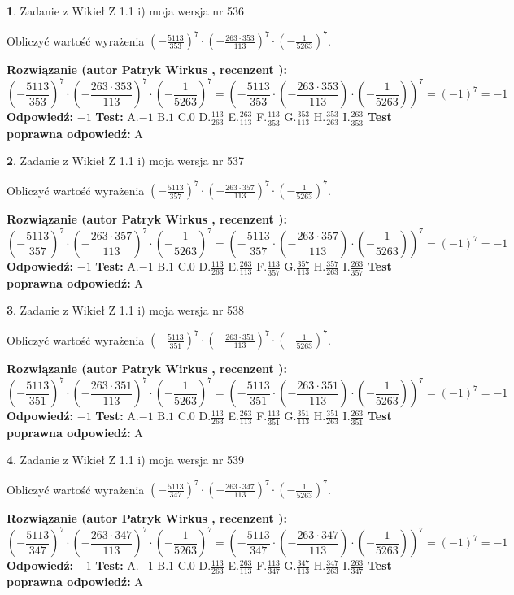 \documentclass[12pt, a4paper]{article}
\theoremstyle{definition} %
\newtheorem{zad}{}
\newcommand{\zadStart}[1]{\begin{zad}#1\newline}
\newcommand{\zadStop}{\end{zad}}
\newcommand{\rozwStart}[2]{\noindent \textbf{Rozwiązanie (autor #1 , recenzent #2): }\newline}
\newcommand{\rozwStop}{\newline}
\newcommand{\odpStart}{\noindent \textbf{Odpowiedź:}\newline}
\newcommand{\odpStop}{\newline}
\newcommand{\testStart}{\noindent \textbf{Test:}\newline}
\newcommand{\testStop}{\newline}
\newcommand{\kluczStart}{\noindent \textbf{Test poprawna odpowiedź:}\newline}
\newcommand{\kluczStop}{\newline}
\begin{document}
\zadStart{Zadanie z Wikieł Z 1.1 i) moja wersja nr 536}

Obliczyć wartość wyrażenia $(-\frac{5113}{353})^{7} \cdot (-\frac{263 \cdot 353}{113})^{7} \cdot (-\frac{1}{5263})^{7}$.
\zadStop
\rozwStart{Patryk Wirkus}{}
$$(-\frac{5113}{353})^{7} \cdot (-\frac{263 \cdot 353}{113})^{7} \cdot (-\frac{1}{5263})^{7} = (-\frac{5113}{353} \cdot (-\frac{263 \cdot 353}{113}) \cdot (-\frac{1}{5263}))^{7} = (-1)^{7} = -1$$
\rozwStop
\odpStart
$-1$
\odpStop
\testStart
A.$-1$ B.$1$ C.$0$ D.$\frac{113}{263}$ E.$\frac{263}{113}$
F.$\frac{113}{353}$ G.$\frac{353}{113}$
H.$\frac{353}{263}$
I.$\frac{263}{353}$
\testStop
\kluczStart
A
\kluczStop



\zadStart{Zadanie z Wikieł Z 1.1 i) moja wersja nr 537}

Obliczyć wartość wyrażenia $(-\frac{5113}{357})^{7} \cdot (-\frac{263 \cdot 357}{113})^{7} \cdot (-\frac{1}{5263})^{7}$.
\zadStop
\rozwStart{Patryk Wirkus}{}
$$(-\frac{5113}{357})^{7} \cdot (-\frac{263 \cdot 357}{113})^{7} \cdot (-\frac{1}{5263})^{7} = (-\frac{5113}{357} \cdot (-\frac{263 \cdot 357}{113}) \cdot (-\frac{1}{5263}))^{7} = (-1)^{7} = -1$$
\rozwStop
\odpStart
$-1$
\odpStop
\testStart
A.$-1$ B.$1$ C.$0$ D.$\frac{113}{263}$ E.$\frac{263}{113}$
F.$\frac{113}{357}$ G.$\frac{357}{113}$
H.$\frac{357}{263}$
I.$\frac{263}{357}$
\testStop
\kluczStart
A
\kluczStop



\zadStart{Zadanie z Wikieł Z 1.1 i) moja wersja nr 538}

Obliczyć wartość wyrażenia $(-\frac{5113}{351})^{7} \cdot (-\frac{263 \cdot 351}{113})^{7} \cdot (-\frac{1}{5263})^{7}$.
\zadStop
\rozwStart{Patryk Wirkus}{}
$$(-\frac{5113}{351})^{7} \cdot (-\frac{263 \cdot 351}{113})^{7} \cdot (-\frac{1}{5263})^{7} = (-\frac{5113}{351} \cdot (-\frac{263 \cdot 351}{113}) \cdot (-\frac{1}{5263}))^{7} = (-1)^{7} = -1$$
\rozwStop
\odpStart
$-1$
\odpStop
\testStart
A.$-1$ B.$1$ C.$0$ D.$\frac{113}{263}$ E.$\frac{263}{113}$
F.$\frac{113}{351}$ G.$\frac{351}{113}$
H.$\frac{351}{263}$
I.$\frac{263}{351}$
\testStop
\kluczStart
A
\kluczStop



\zadStart{Zadanie z Wikieł Z 1.1 i) moja wersja nr 539}

Obliczyć wartość wyrażenia $(-\frac{5113}{347})^{7} \cdot (-\frac{263 \cdot 347}{113})^{7} \cdot (-\frac{1}{5263})^{7}$.
\zadStop
\rozwStart{Patryk Wirkus}{}
$$(-\frac{5113}{347})^{7} \cdot (-\frac{263 \cdot 347}{113})^{7} \cdot (-\frac{1}{5263})^{7} = (-\frac{5113}{347} \cdot (-\frac{263 \cdot 347}{113}) \cdot (-\frac{1}{5263}))^{7} = (-1)^{7} = -1$$
\rozwStop
\odpStart
$-1$
\odpStop
\testStart
A.$-1$ B.$1$ C.$0$ D.$\frac{113}{263}$ E.$\frac{263}{113}$
F.$\frac{113}{347}$ G.$\frac{347}{113}$
H.$\frac{347}{263}$
I.$\frac{263}{347}$
\testStop
\kluczStart
A
\kluczStop
\end{document}
